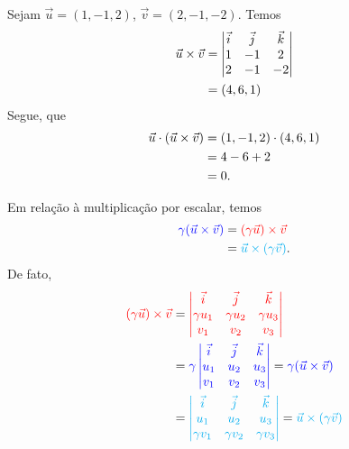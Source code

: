 \begin{ex}
  Sejam $\vec{u}=(1,-1,2)$, $\vec{v}=(2,-1,-2)$. Temos
  \begin{align}
    \vec{u}\times\vec{v} &=
    \begin{vmatrix}
      \vec{i} & \vec{j} & \vec{k} \\
      1 & -1 & 2 \\
      2 & -1 & -2
    \end{vmatrix}\\
              &= (4,6,1)
  \end{align}
  Segue, que
  \begin{align}
    \vec{u}\cdot(\vec{u}\times\vec{v}) &= (1,-1,2)\cdot (4,6,1) \\
                                      &= 4-6+2\\
                                      &= 0.
  \end{align}
\end{ex}

Em relação à multiplicação por escalar, temos
\begin{align}
  {\color{blue}\gamma(\vec{u}\times\vec{v})} &= {\color{red}(\gamma\vec{u})\times\vec{v}} \\
                              &= {\color{cyan}\vec{u}\times(\gamma\vec{v})}.
\end{align}
De fato,
\begin{align}
  {\color{red}(\gamma\vec{u})\times\vec{v}} &=
                                {\color{red}\begin{vmatrix}
                                  \vec{i} & \vec{j} & \vec{k} \\
                                  \gamma u_1 & \gamma u_2 & \gamma u_3\\
                                  v_1 & v_2 & v_3
                                \end{vmatrix}} \\
                              &= {\color{blue}\gamma\begin{vmatrix}
                                  \vec{i} & \vec{j} & \vec{k} \\
                                  u_1 & u_2 & u_3\\
                                  v_1 & v_2 & v_3
                                \end{vmatrix}} = {\color{blue}\gamma(\vec{u}\times\vec{v})}\\
                              &=
                                {\color{cyan}\begin{vmatrix}
                                  \vec{i} & \vec{j} & \vec{k} \\
                                  u_1 & u_2 & u_3\\
                                  \gamma v_1 & \gamma v_2 & \gamma v_3
                                \end{vmatrix}} = {\color{cyan}\vec{u}\times(\gamma\vec{v})}
\end{align}


